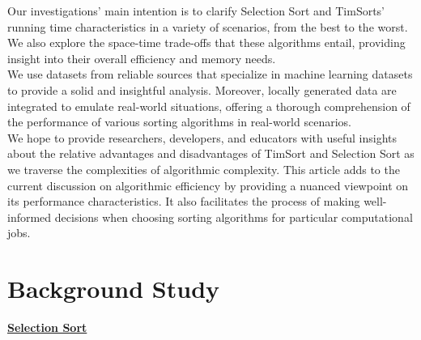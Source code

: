 \documentclass[article,10pt]{article}
\begin{document}
\begin{multicols}{2}

Our investigations' main intention is to clarify Selection Sort and TimSorts' running time characteristics in a variety of scenarios, from the best to the worst. We also explore the space-time trade-offs that these algorithms entail, providing insight into their overall efficiency and memory needs.\\

We use datasets from reliable sources that specialize in machine learning datasets to provide a solid and insightful analysis. Moreover, locally generated data are integrated to emulate real-world situations, offering a thorough comprehension of the performance of various sorting algorithms in real-world scenarios.\\


We hope to provide researchers, developers, and educators with useful insights about the relative advantages and disadvantages of TimSort and Selection Sort as we traverse the complexities of algorithmic complexity. This article adds to the current discussion on algorithmic efficiency by providing a nuanced viewpoint on its performance characteristics. It also facilitates the process of making well-informed decisions when choosing sorting algorithms for particular computational jobs.


\section{Background Study}


\begin{center} \underline{\textbf{Selection Sort}} \end{center}
\begin{figure}[t!]\centering {}
    \begin{tabular}{p{3cm} p{1cm} p{4cm}}
      

\end{tabular}
\end{figure}
\end{multicols}
\end{document}
